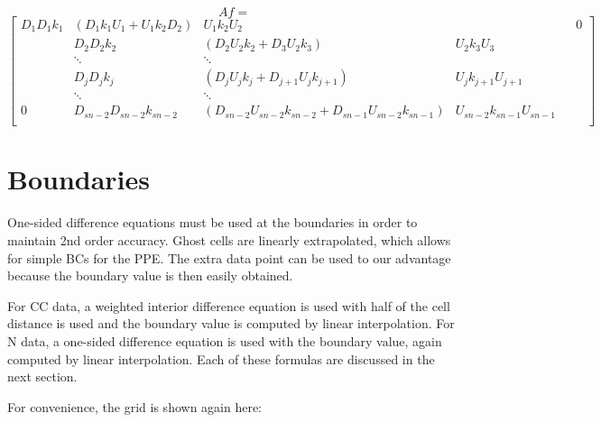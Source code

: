 \documentclass[11pt]{article}
\begin{document}
\begin{equation}
  Af =
\end{equation}
\[
\left[
\begin{array}{ccccccccc}
D_1D_1k_1&(D_1k_1U_1+U_1k_2D_2) &U_1k_2U_2          &           &                             &                    0                      \\
         &D_2D_2k_2           &(D_2U_2k_2+D_3U_2k_3)&U_2k_3U_3  &                             &                                         \\
         &\ddots             &\ddots     &                             &                    &                                         \\
         &D_j D_j k_j&(D_jU_jk_j+D_{j+1}U_{j}k_{j+1})&U_jk_{j+1}U_{j+1}   &                                         \\
         &\ddots                       &\ddots              &                                         \\
0        &D_{sn-2} D_{sn-2} k_{sn-2}&(D_{sn-2}U_{sn-2}k_{sn-2}+D_{sn-1}U_{sn-2}k_{sn-1})&U_{sn-2}k_{sn-1}U_{sn-1}   &                                         \\
\end{array}
\right]
\]


\section{Boundaries}
One-sided difference equations must be used at the boundaries in order to maintain 2nd order accuracy. Ghost cells are linearly extrapolated, which allows for simple BCs for the PPE. The extra data point can be used to our advantage because the boundary value is then easily obtained.

For CC data, a weighted interior difference equation is used with half of the cell distance is used and the boundary value is computed by linear interpolation. For N data, a one-sided difference equation is used with the boundary value, again computed by linear interpolation. Each of these formulas are discussed in the next section.

For convenience, the grid is shown again here:
\end{document}
